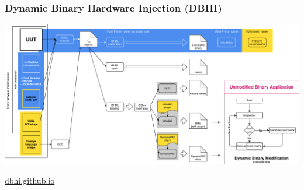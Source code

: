 \documentclass{beamer}
\begin{document}
\begin{frame}
\frametitle{Dynamic Binary Hardware Injection (DBHI)}
\centering
\includegraphics[width=\linewidth]{diagram.pdf}

\vfill
\Large\href{https://dbhi.github.io/}{dbhi.github.io}
\end{frame}
\end{document}
